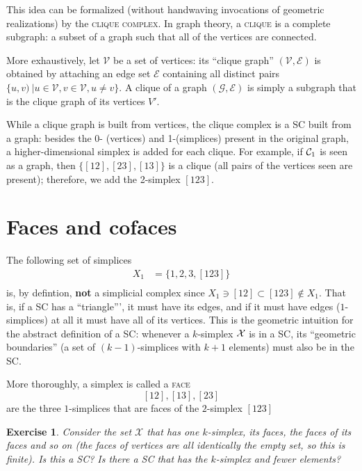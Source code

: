 \documentclass{tufte-handout}
\newtheorem{exercise}{Exercise}
\newcommand{\define}{\textsc}
\begin{document}
This idea can be formalized (without handwaving invocations of geometric realizations) by the \textsc{clique complex}. In graph theory, a \textsc{clique} is a complete subgraph: a subset of a graph such that all of the vertices are connected. 

More exhaustively,  let  $\mathcal V$ be a set of vertices: its ``clique graph'' $(\mathcal V, \mathcal E)$ is obtained by attaching an edge set $\mathcal E$ containing all distinct pairs $\{u,v)\ | u\in \mathcal V, v \in \mathcal V, u\neq v\}$. A clique of a graph $(\mathcal G, \mathcal E)$ is simply a subgraph that is the clique graph of its vertices $V'$. 

While a clique graph is built from vertices, the clique complex is a SC built from a graph: besides the 0- (vertices) and 1-(simplices) present in the original graph, a higher-dimensional simplex is added for each clique. For example, if $\sc_1$ is seen as a graph, then  $\{[12],[23],[13]\}$ is a clique (all pairs of the vertices seen are present); therefore, we add the 2-simplex $[123]$. 


\section{Faces and cofaces}
The following set of simplices
\begin{align*}
    X_1 &= \{1,2,3,[123]\}\\
\end{align*}
is, by defintion, \textbf{not} a simplicial complex since $X_1 \ni [12]\subset [123]\not \in X_1$. That is,
if a SC has a ``triangle''', it must have its edges, and if it must have edges ($1$-simplices) at all it must have all of its vertices. This is the geometric intuition for the abstract definition of a SC:  whenever a $k$-simplex $\se$ is in a SC, its ``geometric boundaries'' (a set of $(k-1)$-simplices with $k+1$ elements) must also be in the SC. 

More thoroughly, a simplex is called a \define{face} 
\[
[12],[13],[23]
\]
are the three $1$-simplices that are faces of the $2$-simplex $[123]$
\begin{exercise}
Consider the set $\mathcal X$ that has one $k$-simplex, its faces, the faces of its faces and so on (the faces of vertices are all identically the empty set, so this is finite). Is this a SC? Is there a SC that has the $k$-simplex and fewer elements?
\end{exercise}
\end{document}

